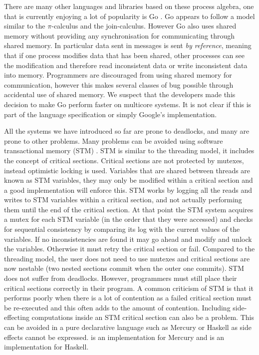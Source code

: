 There are many other languages and libraries based on these process algebra,
one that is currently enjoying a lot of popularity is Go
\citep{balbaert:2012:go}.
Go appears to follow a model similar to the $\pi$-calculus and the
join-calculus.
However Go also uses shared memory without providing any synchronisation
for communicating through shared memory.
In particular data sent in messages is sent \emph{by reference},
meaning that if one process modifies data that has been shared,
other processes can see the modification and therefore read inconsistent data
or write inconsistent data into memory.
Programmers are discouraged from using shared memory for communication,
however this makes several classes of bug possible through accidental use of
shared memory.
We suspect that the developers made this decision to make Go perform faster on
multicore systems.
It is not clear if this is part of the language specification or simply
Google's implementation.

All the systems we have introduced so far are prone to deadlocks,
and many are prone to other problems.
Many problems can be avoided using software transactional memory (STM)
\citep{stm}.
STM is similar to the threading model, it includes the concept of critical
sections.
Critical sections are not protected by mutexes,
instead optimistic locking is used.
Variables that are shared between threads are known as STM variables,
they may only be modified within a critical section and a good implementation
will enforce this.
STM works by logging all the reads and writes to STM variables within a
critical section, and not actually performing them until the end of the
critical section.
At that point the STM system acquires a mutex for each STM variable (in the
order that they were accessed)
and checks for sequential consistency by comparing its log with the current
values of the variables.
If no inconsistencies are found
it may go ahead and modify and unlock the variables.
Otherwise it must retry the critical section or fail.
Compared to the threading model,
the user does not need to use mutexes and critical sections are now
nestable (two nested sections commit when the outer one commits).
STM does not suffer from deadlocks.
However, programmers must still place their critical sections correctly in
their program.
A common criticism of STM is that it performs poorly when there is a lot of
contention as a failed critical section must be re-executed and this often
adds to the amount of contention.
Including side-effecting computations inside an STM critical section can also
be a problem.
This can be avoided in a pure declarative language such as
Mercury \citep{mercury_jlp} or Haskell \citep{haskell98} as side effects cannot
be expressed.
\citet{mika:mercury-stm} is an implementation for Mercury
and \citet{harris:2005:haskell-stm} is an implementation for Haskell.



